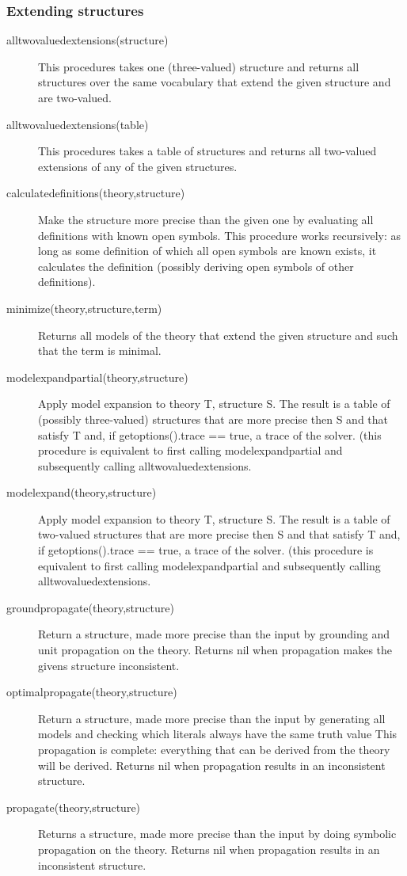 \documentclass[a4]{article}
\begin{document}
\subsubsection{Extending structures}
\begin{description}
	\item[alltwovaluedextensions(structure)] This procedures takes one (three-valued) structure and returns all structures over the same vocabulary that extend the given structure and are two-valued.
	\item[alltwovaluedextensions(table)]
		This procedures takes a table of structures and returns all two-valued extensions of any of the given structures.
	\item[calculatedefinitions(theory,structure)]
		Make the structure more precise than the given one by evaluating all definitions with known open symbols. This procedure works recursively: as long as some definition of which all open symbols are known exists, it calculates the definition (possibly deriving open symbols of other definitions).
	\item[minimize(theory,structure,term)] Returns all models of the theory that extend the given structure and such that the term is minimal.
	\item[modelexpandpartial(theory,structure)]
		Apply model expansion to theory T, structure S.
 		The result is a table of (possibly three-valued) structures that are more precise then S and that satisfy T  and, if getoptions().trace == true, a trace of the solver.
		(this procedure is equivalent to first calling modelexpandpartial and subsequently calling alltwovaluedextensions. 
	\item[modelexpand(theory,structure)]
 		Apply model expansion to theory T, structure S.
 		The result is a table of two-valued structures that are more precise then S and that satisfy T and, if getoptions().trace == true, a trace of the solver.
		(this procedure is equivalent to first calling modelexpandpartial and subsequently calling alltwovaluedextensions. 
	\item[groundpropagate(theory,structure)]
 		Return a structure, made more precise than the input by grounding and unit propagation on the theory.
		Returns nil when propagation makes the givens structure inconsistent.
	\item[optimalpropagate(theory,structure)]
 		Return a structure, made more precise than the input by generating all models and checking which literals always have the same truth value
 		This propagation is complete: everything that can be derived from the theory will be derived. 
 		Returns nil when propagation results in an inconsistent structure.
	\item[propagate(theory,structure)]
 		Returns a structure, made more precise than the input by doing symbolic propagation on the theory.
 		Returns nil when propagation results in an inconsistent structure.
\end{description}
\end{document}
